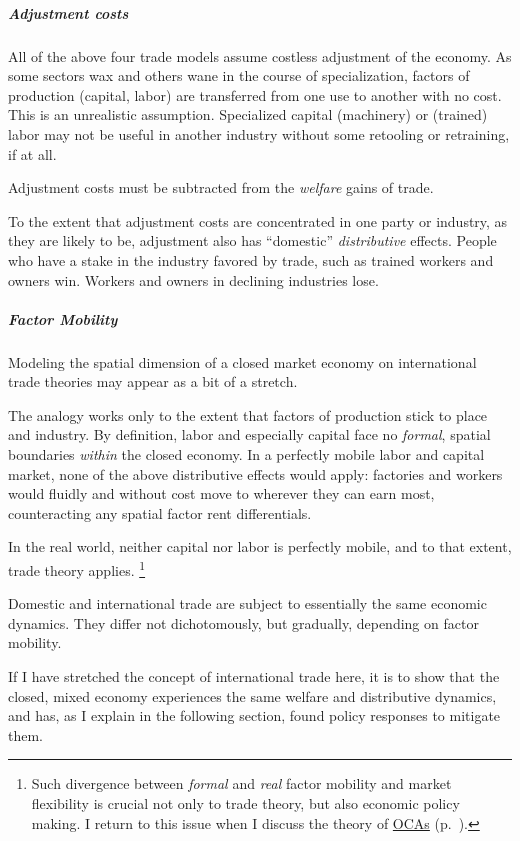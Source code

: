 \subparagraph{Adjustment costs}  \label{sec:adjustment-costs}
All of the above four trade models assume costless adjustment of the economy.
As some sectors wax and others wane in the course of specialization, factors of production (capital, labor) are transferred from one use to another with no cost.
This is an unrealistic assumption.
Specialized capital (machinery) or (trained) labor may not be useful in another industry without some retooling or retraining, if at all.

Adjustment costs must be subtracted from the \emph{welfare} gains of trade.

To the extent that adjustment costs are concentrated in one party or industry, as they are likely to be, adjustment also has ``domestic'' \emph{distributive} effects.
People who have a stake in the industry favored by trade, such as trained workers and owners win.
Workers and owners in declining industries lose.

\subparagraph{Factor Mobility}  \label{sec:factor-mobility-trade}
Modeling the spatial dimension of a closed market economy on international trade theories may appear as a bit of a stretch.

The analogy works only to the extent that factors of production stick to place and industry.
By definition, labor and especially capital face no \emph{formal}, spatial boundaries \emph{within} the closed economy.
In a perfectly mobile labor and capital market, none of the above distributive effects would apply:
factories and workers would fluidly and without cost move to wherever they can earn most, counteracting any spatial factor rent differentials.

In the real world, neither capital nor labor is perfectly mobile, and to that extent, trade theory applies.
\footnote{
	Such divergence between \emph{formal} and \emph{real} factor mobility and market flexibility is crucial not only to trade theory, but also economic policy making.
	I return to this issue when I discuss the theory of \hyperref[sec:OCA]{\glspl{OCA}} (p.~\pageref{sec:OCA}).
}

Domestic and international trade are subject to essentially the same economic dynamics.
They differ not dichotomously, but gradually, depending on factor mobility.

If I have stretched the concept of international trade here, it is to show that the closed, mixed economy experiences the same welfare and distributive dynamics, and has, as I explain in the following section, found policy responses to mitigate them.

